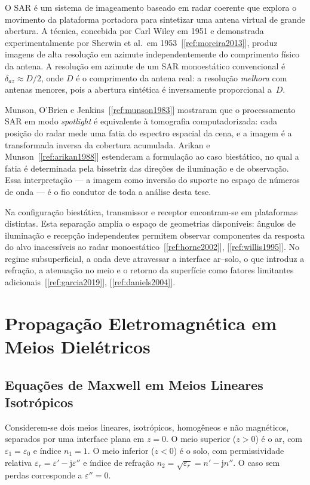 \documentclass[12pt,a4paper,oneside]{book}
\theoremstyle{remark}
\newcommand{\jj}{\mathrm{j}}
\newcommand{\citar}[1]{[\ref{ref:#1}]}
\theoremstyle{plain}
\theoremstyle{definition}
\begin{document}
O SAR é um sistema de imageamento baseado em radar coerente que explora o
movimento da plataforma portadora para sintetizar uma antena virtual de grande
abertura. A técnica, concebida por Carl Wiley em 1951 e demonstrada
experimentalmente por Sherwin et al.\ em 1953~\citar{moreira2013}, produz imagens
de alta resolução em azimute independentemente do comprimento físico da antena.
A resolução em azimute de um SAR monoestático convencional é
$\delta_{az} \approx D/2$, onde $D$ é o comprimento da antena real: a resolução
\emph{melhora} com antenas menores, pois a abertura sintética é inversamente
proporcional a~$D$.

Munson, O'Brien e Jenkins~\citar{munson1983} mostraram que o processamento SAR
em modo \textit{spotlight} é equivalente à tomografia computadorizada: cada
posição do radar mede uma fatia do espectro espacial da cena, e a imagem é a
transformada inversa da cobertura acumulada. Arikan e Munson~\citar{arikan1988}
estenderam a formulação ao caso biestático, no qual a fatia é determinada pela
bissetriz das direções de iluminação e de observação. Essa interpretação ---
a imagem como inversão do suporte no espaço de números de onda --- é o fio
condutor de toda a análise desta tese.

Na configuração biestática, transmissor e receptor encontram-se em plataformas
distintas. Esta separação amplia o espaço de geometrias disponíveis: ângulos de
iluminação e recepção independentes permitem observar componentes da resposta
do alvo inacessíveis ao radar monoestático~\citar{horne2002}, \citar{willis1995}.
No regime subsuperficial, a onda deve atravessar a interface ar--solo, o que
introduz a refração, a atenuação no meio e o retorno da superfície como fatores
limitantes adicionais~\citar{garcia2019}, \citar{daniels2004}.

\section{Propagação Eletromagnética em Meios Dielétricos}
\label{sec:fund_em}

\subsection{Equações de Maxwell em Meios Lineares Isotrópicos}
\label{ssec:maxwell}

Considerem-se dois meios lineares, isotrópicos, homogêneos e não magnéticos,
separados por uma interface plana em $z = 0$. O meio superior ($z > 0$) é o ar,
com $\varepsilon_1 = \varepsilon_0$ e índice $n_1 = 1$. O meio inferior
($z < 0$) é o solo, com permissividade relativa
$\varepsilon_r = \varepsilon' - \jj\varepsilon''$ e índice de refração
$n_2 = \sqrt{\varepsilon_r} = n' - \jj n''$. O caso sem perdas corresponde a
$\varepsilon''=0$.
\end{document}

